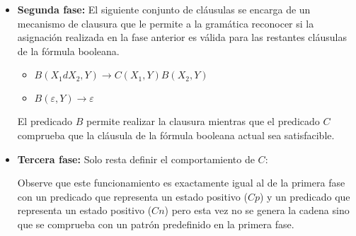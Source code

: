 \documentclass[12pt]{article}
\begin{document}
\begin{itemize}
    \item \textbf{Segunda fase:} El siguiente conjunto de cláusulas se encarga de un mecanismo de clausura que le permite a la gramática
          reconocer si la asignación realizada en la fase anterior es válida para las restantes cláusulas de la fórmula
          booleana.
          \begin{itemize}
              \item $B(X_1dX_2,Y)\to C(X_1,Y) B(X_2,Y)$
              \item $B(\varepsilon,Y)\to\varepsilon$
          \end{itemize}

          El predicado $B$ permite realizar la clausura mientras que el predicado $C$ comprueba que la cláusula de la fórmula
          booleana actual sea satisfacible.

    \item \textbf{Tercera fase:} Solo resta definir el comportamiento de $C$:
          \begin{itemize}
          \end{itemize}

          Observe que este funcionamiento es exactamente igual al de la primera fase con un predicado que representa un estado
          positivo ($Cp$) y un predicado que representa un estado
          positivo ($Cn$) pero esta vez no se genera la cadena sino que se comprueba con un patrón predefinido en la primera
          fase.

\end{itemize}
\end{document}
